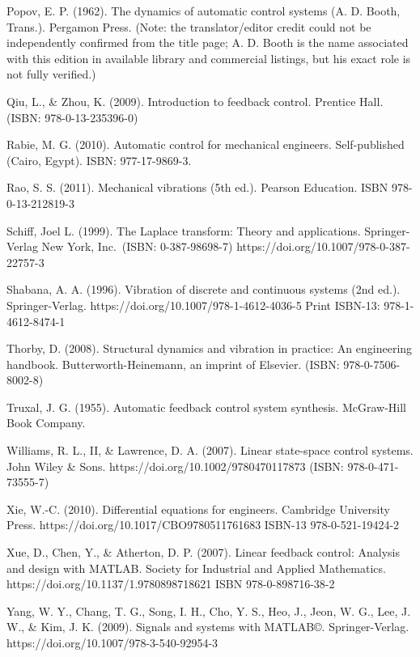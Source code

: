\documentclass[
  11pt,
]{article}
\begin{document}
Popov, E. P. (1962). The dynamics of automatic control systems (A. D.
Booth, Trans.). Pergamon Press. (Note: the translator/editor credit
could not be independently confirmed from the title page; A. D. Booth is
the name associated with this edition in available library and
commercial listings, but his exact role is not fully verified.)

Qiu, L., \& Zhou, K. (2009). Introduction to feedback control. Prentice
Hall. (ISBN: 978-0-13-235396-0)

Rabie, M. G. (2010). Automatic control for mechanical engineers.
Self-published (Cairo, Egypt). ISBN: 977-17-9869-3.

Rao, S. S. (2011). Mechanical vibrations (5th ed.). Pearson Education.
ISBN 978-0-13-212819-3

Schiff, Joel L. (1999). The Laplace transform: Theory and applications.
Springer-Verlag New York, Inc.~(ISBN: 0-387-98698-7)
https://doi.org/10.1007/978-0-387-22757-3

Shabana, A. A. (1996). Vibration of discrete and continuous systems (2nd
ed.). Springer-Verlag. https://doi.org/10.1007/978-1-4612-4036-5 Print
ISBN-13: 978-1-4612-8474-1

Thorby, D. (2008). Structural dynamics and vibration in practice: An
engineering handbook. Butterworth-Heinemann, an imprint of Elsevier.
(ISBN: 978-0-7506-8002-8)

Truxal, J. G. (1955). Automatic feedback control system synthesis.
McGraw-Hill Book Company.

Williams, R. L., II, \& Lawrence, D. A. (2007). Linear state-space
control systems. John Wiley \& Sons.
https://doi.org/10.1002/9780470117873 (ISBN: 978-0-471-73555-7)

Xie, W.-C. (2010). Differential equations for engineers. Cambridge
University Press. https://doi.org/10.1017/CBO9780511761683 ISBN-13
978-0-521-19424-2

Xue, D., Chen, Y., \& Atherton, D. P. (2007). Linear feedback control:
Analysis and design with MATLAB. Society for Industrial and Applied
Mathematics. https://doi.org/10.1137/1.9780898718621 ISBN
978-0-898716-38-2

Yang, W. Y., Chang, T. G., Song, I. H., Cho, Y. S., Heo, J., Jeon, W.
G., Lee, J. W., \& Kim, J. K. (2009). Signals and systems with MATLAB©.
Springer-Verlag. https://doi.org/10.1007/978-3-540-92954-3
\end{document}
